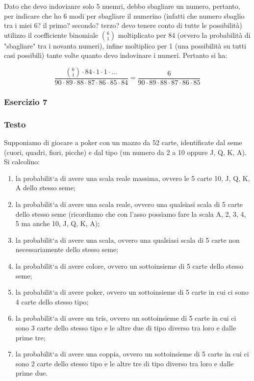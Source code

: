 Dato che devo indovianre solo 5 nuemri, debbo sbagliare un numero, pertanto, per indicare che ho 6 modi per sbagliare il numerino (infatti che numero sbaglio tra i miei 6? il primo? secondo? terzo? devo tenere conto di tutte le possibilità) utilizzo il coefficiente binomiale $\binom{6}{1}$ moltiplicato per $84$ (ovvero la probabilità di "sbagliare" tra i novanta numeri), infine moltiplico per 1 (una possibilità su tutti casi possibili) tante volte quanto devo indovinare i numeri. Pertanto si ha:  

\[
  \frac{\binom{6}{1}\cdot 84 \cdot 1 \cdot 1 \cdot \dots}{90\cdot 89 \cdot 88 \cdot 87 \cdot 86 \cdot 85 \cdot 84} = \frac{6}{90\cdot 89 \cdot 88 \cdot 87 \cdot 86 \cdot 85 }
\]

\subsubsection{Esercizio 7}
\subsubsection{Testo}
Supponiamo di giocare a poker con un mazzo da 52 carte, identificate dal seme (cuori, quadri, fiori, picche) e dal tipo (un numero da 2 a 10 oppure J, Q, K, A). Si calcolino: 
\begin{enumerate}[label=(\alph*)]
\item la probabilit`a di avere una scala reale massima, ovvero le 5 carte 10, J, Q, K, A dello stesso seme;
\item la probabilit`a di avere una scala reale, ovvero una qualsiasi scala di 5 carte dello stesso seme (ricordiamo che con l’asso possiamo fare la scala A, 2, 3, 4, 5 ma anche 10, J, Q, K, A);
\item la probabilit`a di avere una scala, ovvero una qualsiasi scala di 5 carte non necessariamente dello stesso seme;
\item la probabilit`a di avere colore, ovvero un sottoinsieme di 5 carte dello stesso seme;
\item la probabilit`a di avere poker, ovvero un sottoinsieme di 5 carte in cui ci sono 4 carte dello stesso tipo;
\item la probabilit`a di avere un tris, ovvero un sottoinsieme di 5 carte in cui ci sono 3 carte dello stesso tipo e le altre due di tipo diverso tra loro e dalle prime tre;
\item la probabilit`a di avere una coppia, ovvero un sottoinsieme di 5 carte in cui ci sono 2 carte dello stesso tipo e le altre tre di tipo diverso tra loro e dalle prime due.
\end{enumerate}

